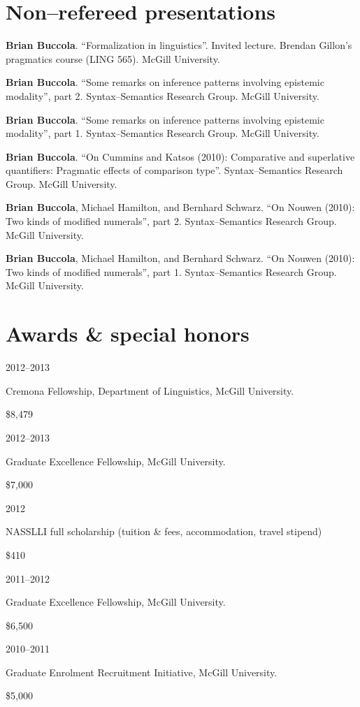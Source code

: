 \documentclass[11pt,letterpaper]{article}
\newcommand{\name}{Brian Buccola}
\newcommand{\cvitem}[2]{%
  \begin{minipage}[t]{0.24\textwidth}
    #1 %
  \end{minipage}
  \hfill
  \begin{minipage}[t]{0.74\textwidth}
    #2 %
  \end{minipage}
}
\newcommand{\award}[2]{%
  \begin{minipage}[t]{0.78\textwidth}
    #1        %
  \end{minipage}
  \hfill
  \begin{minipage}[t]{0.20\textwidth}
    \hfill #2 %
  \end{minipage}
}
\begin{document}
\section*{Non--refereed presentations}

\cvitem{}{\textbf{\name}. ``Formalization in
linguistics''. Invited lecture. Brendan Gillon's pragmatics course (LING 565).
McGill University.}

\cvitem{}{\textbf{\name}. ``Some remarks on inference
patterns involving epistemic modality'', part 2. Syntax--Semantics Research
Group.  McGill University.}

\cvitem{}{\textbf{\name}. ``Some remarks on inference
patterns involving epistemic modality'', part 1. Syntax--Semantics Research
Group.  McGill University.}

\cvitem{}{\textbf{\name}. ``On Cummins and Katsos
(2010): Comparative and superlative quantifiers: Pragmatic effects of
comparison type''.  Syntax--Semantics Research Group. McGill University.}

\cvitem{}{\textbf{\name}, Michael Hamilton, and
Bernhard Schwarz.  ``On Nouwen (2010): Two kinds of modified numerals'', part
2.  Syntax--Semantics Research Group. McGill University.}

\cvitem{}{\textbf{\name}, Michael Hamilton, and Bernhard
Schwarz.  ``On Nouwen (2010): Two kinds of modified numerals'', part 1.
Syntax--Semantics Research Group. McGill University.}



\section*{Awards \& special honors}

\cvitem{2012--2013}{\award{Cremona Fellowship, Department of Linguistics, McGill
University.}{\$8,479}}

\cvitem{2012--2013}{\award{Graduate Excellence Fellowship, McGill
University.}{\$7,000}}

\cvitem{2012}{\award{NASSLLI full scholarship (tuition \& fees, accommodation,
travel stipend)}{\$410}}

\cvitem{2011--2012}{\award{Graduate Excellence Fellowship, McGill
University.}{\$6,500}}

\cvitem{2010--2011}{\award{Graduate Enrolment Recruitment Initiative, McGill
University.}{\$5,000}}
\end{document}
